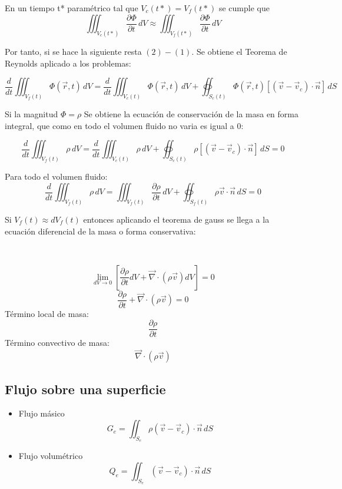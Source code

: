En un tiempo t* paramétrico tal que $V_c(t*)=V_f(t*)$ se cumple que
\[ \iiint_{V_c(t*)}\frac{\partial \Phi}{\partial t}\,dV\approx \iiint_{V_f(t*)}\frac{\partial \Phi}{\partial t}\,dV\]

Por tanto, si se hace la siguiente resta $(2)-(1)$. Se obtiene el Teorema de Reynolds aplicado a los problemas:

\[\frac{d}{dt}\iiint_{V_f(t)}\Phi(\vec{r},t)\,dV=\frac{d}{dt}\iiint_{V_c(t)}\Phi(\vec{r},t)\,dV+\oiint_{S_c(t)} \Phi(\vec{r},t)\left[(\vec{v}-\vec{v}_c)\cdot\vec{n}\right] \,dS\]



Si la magnitud $\Phi = \rho$ Se obtiene la ecuación de conservación de la masa en forma integral, que como en todo el volumen fluido no varia es igual a 0:

\[\frac{d}{dt}\iiint_{V_f(t)}\rho\,dV=\frac{d}{dt}\iiint_{V_c(t)}\rho\,dV+\oiint_{S_c(t)} \rho\left[(\vec{v}-\vec{v}_c)\cdot\vec{n}\right] \,dS=0\]

Para todo el volumen fluido:
\[\frac{d}{dt}\iiint_{V_f(t)} \rho \,dV=\iiint_{V_f(t)} \frac{\partial \rho}{\partial t} \,dV+\oiint_{S_f(t)} \rho\vec{v}\cdot\vec{n} \,dS=0\]

Si $V_f(t)\approx dV_f(t)$ entonces aplicando el teorema de gauss se llega a la ecuación diferencial de la masa o forma conservativa:

\
\
\
\begin{center}
\end{center}

\[\lim_{dV \to 0}\left[\frac{\partial \rho}{\partial t} dV+\vec{\nabla}\cdot\left(\rho\vec{v}\right)dV\right]=0\]
\[\frac{\partial \rho}{\partial t} +\vec{\nabla}\cdot\left(\rho\vec{v}\right)=0\]
Término local de masa: 
\[\frac{\partial \rho}{\partial t}\]
Término convectivo de masa:
\[\vec{\nabla}\cdot\left(\rho\vec{v}\right)\]

\subsection{Flujo sobre una superficie}
\begin{itemize}
	\item Flujo másico
	\[G_e=\iint_{S_e} \rho\left(\vec{v}-\vec{v}_c\right)\cdot\vec{n}\,dS\]
	\item Flujo volumétrico
		\[Q_e=\iint_{S_e} \left(\vec{v}-\vec{v}_c\right)\cdot\vec{n}\,dS\]
\end{itemize}

